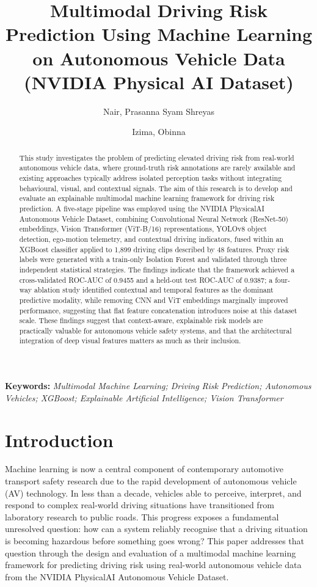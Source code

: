 \documentclass[11pt,a4paper]{article}
\title{\textbf{Multimodal Driving Risk Prediction Using Machine Learning on Autonomous Vehicle Data (NVIDIA Physical AI Dataset)}}
\author[1]{Nair, Prasanna Syam Shreyas}
\author[1]{Izima, Obinna}
\affil[1]{School of Computing, Dublin Business School, Dublin, Ireland}
\date{}
\begin{document}
\maketitle

\begin{abstract}
This study investigates the problem of predicting elevated driving risk from real-world autonomous vehicle data, where ground-truth risk annotations are rarely available and existing approaches typically address isolated perception tasks without integrating behavioural, visual, and contextual signals. The aim of this research is to develop and evaluate an explainable multimodal machine learning framework for driving risk prediction. A five-stage pipeline was employed using the NVIDIA PhysicalAI Autonomous Vehicle Dataset, combining Convolutional Neural Network (ResNet-50) embeddings, Vision Transformer (ViT-B/16) representations, YOLOv8 object detection, ego-motion telemetry, and contextual driving indicators, fused within an XGBoost classifier applied to 1,899 driving clips described by 48 features. Proxy risk labels were generated with a train-only Isolation Forest and validated through three independent statistical strategies. The findings indicate that the framework achieved a cross-validated ROC-AUC of 0.9455 and a held-out test ROC-AUC of 0.9387; a four-way ablation study identified contextual and temporal features as the dominant predictive modality, while removing CNN and ViT embeddings marginally improved performance, suggesting that flat feature concatenation introduces noise at this dataset scale. These findings suggest that context-aware, explainable risk models are practically valuable for autonomous vehicle safety systems, and that the architectural integration of deep visual features matters as much as their inclusion.
\end{abstract}

\noindent\textbf{Keywords:} \textit{Multimodal Machine Learning; Driving Risk Prediction; Autonomous Vehicles; XGBoost; Explainable Artificial Intelligence; Vision Transformer}


\section{Introduction}

Machine learning is now a central component of contemporary automotive transport safety research due to the rapid development of autonomous vehicle (AV) technology. In less than a decade, vehicles able to perceive, interpret, and respond to complex real-world driving situations have transitioned from laboratory research to public roads. This progress exposes a fundamental unresolved question: how can a system reliably recognise that a driving situation is becoming hazardous before something goes wrong? This paper addresses that question through the design and evaluation of a multimodal machine learning framework for predicting driving risk using real-world autonomous vehicle data from the NVIDIA PhysicalAI Autonomous Vehicle Dataset.
\end{document}
